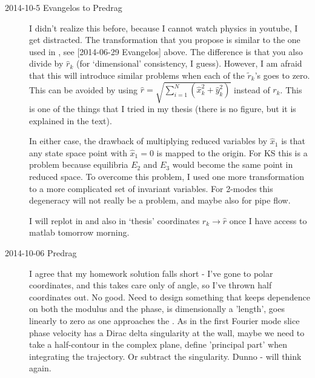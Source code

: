 \begin{description}
\item[2014-10-5 Evangelos to Predrag] I didn't realize this before, because I cannot watch
physics in youtube, I get distracted. The transformation that you propose is similar to
the one used in , see [2014-06-29 Evangelos]
above. The difference is that you also divide by $\hat{r}_k$ (for `dimensional' consistency, I guess).
However, I am afraid that this will introduce similar problems when each of the $\tilde{r}_k$'s goes to zero.
This can be avoided by using $\hat{r}=\sqrt{\sum_{i=1}^{N}\left(\hat{x}_k^2 + \hat{y}_k^2\right)}$ instead of $r_k$.
This is one of the things that I tried in my thesis
(there is no figure, but it is explained
in the text).

In either case, the drawback of multiplying reduced variables by $\hat{x}_1$ is that any state space point with $\hat{x}_1=0$
is mapped to the origin. For KS this is a problem because equilibria $E_2$ and $E_3$ would become the same point
in reduced space. To overcome this problem, I used one more transformation to a more complicated set of invariant variables.
For 2-modes this degeneracy will not really be a problem, and maybe also for pipe flow.

I will replot  in 
and also in `thesis' coordinates $\hat{r}_k\rightarrow\hat{r}$ once I have access
to matlab tomorrow morning.

\item[2014-10-06 Predrag] I agree that my homework solution falls
short - I've gone to polar coordinates, and this takes care only of
angle, so I've thrown half coordinates out. No good. Need to design
something that keeps dependence on both the modulus and the phase, is
dimensionally a 'length', goes linearly to zero as one approaches the
{\sliceBord}. As in the first Fourier mode slice phase velocity has a
Dirac delta singularity at the wall, maybe we need to take a half-contour
in the complex plane, define 'principal part' when integrating the
trajectory. Or subtract the singularity. Dunno - will think again.
\end{description}
